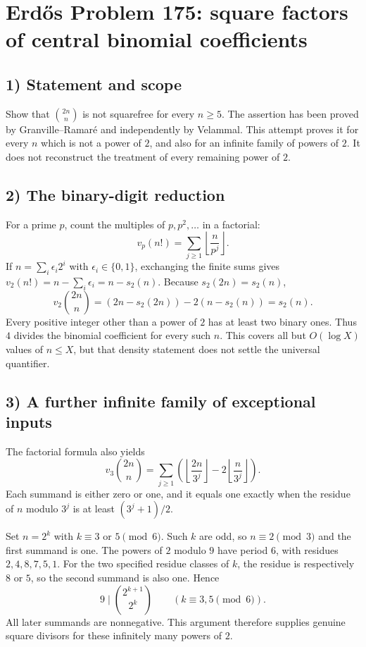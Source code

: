 \section{Erd\H{o}s Problem 175: square factors of central binomial coefficients}

\subsection{1) Statement and scope}
Show that $\binom{2n}{n}$ is not squarefree for every $n\geq5$.
The assertion has been proved by Granville--Ramar\'e and independently
by Velammal. This attempt proves it for every $n$ which is not a power
of $2$, and also for an infinite family of powers of $2$. It does not
reconstruct the treatment of every remaining power of $2$.

\subsection{2) The binary-digit reduction}
For a prime $p$, count the multiples of $p,p^2,\ldots$ in a factorial:
\[
 v_p(n!)=\sum_{j\geq1}\left\lfloor\frac n{p^j}\right\rfloor.
\]
If $n=\sum_i\epsilon_i2^i$ with $\epsilon_i\in\{0,1\}$, exchanging
the finite sums gives $v_2(n!)=n-\sum_i\epsilon_i=n-s_2(n)$.
Because $s_2(2n)=s_2(n)$,
\[
 v_2\binom{2n}{n}
 =(2n-s_2(2n))-2(n-s_2(n))=s_2(n).
\]
Every positive integer other than a power of $2$ has at least two binary
ones. Thus $4$ divides the binomial coefficient for every such $n$.
This covers all but $O(\log X)$ values of $n\leq X$, but that density
statement does not settle the universal quantifier.

\subsection{3) A further infinite family of exceptional inputs}
The factorial formula also yields
\[
 v_3\binom{2n}{n}
 =\sum_{j\geq1}
 \left(\left\lfloor\frac{2n}{3^j}\right\rfloor
             -2\left\lfloor\frac n{3^j}\right\rfloor\right).
\]
Each summand is either zero or one, and it equals one exactly when
the residue of $n$ modulo $3^j$ is at least $(3^j+1)/2$.

Set $n=2^k$ with $k\equiv3$ or $5\pmod6$. Such $k$ are odd, so
$n\equiv2\pmod3$ and the first summand is one. The powers of $2$
modulo $9$ have period $6$, with residues $2,4,8,7,5,1$.
For the two specified residue classes of $k$, the residue is respectively
$8$ or $5$, so the second summand is also one. Hence
\[
 9\mid\binom{2^{k+1}}{2^k}\qquad(k\equiv3,5\pmod6).
\]
All later summands are nonnegative. This argument therefore supplies
genuine square divisors for these infinitely many powers of $2$.

